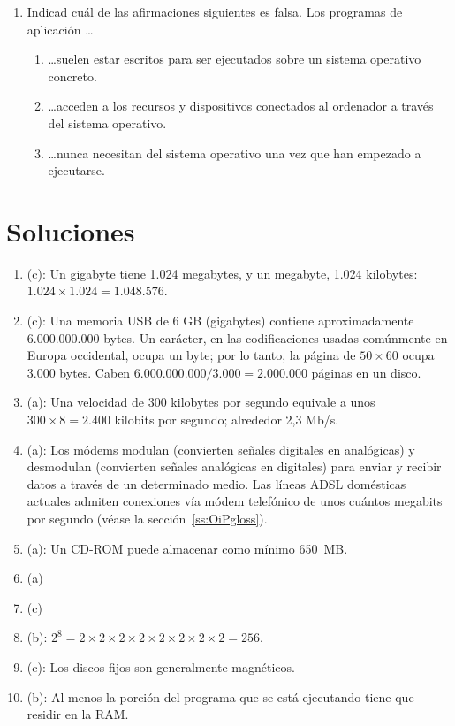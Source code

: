 \begin{enumerate}
\item Indicad cuál de las afirmaciones siguientes es falsa. Los programas de aplicación \ldots \begin{enumerate} \item \ldots suelen estar escritos para ser ejecutados sobre un sistema operativo concreto. \item \ldots acceden a los recursos y dispositivos conectados al ordenador a través del sistema operativo. \item \ldots nunca necesitan del sistema operativo una vez que han empezado a ejecutarse. \end{enumerate} 

\end{enumerate} 

\section{Soluciones} \begin{enumerate} \item (c): Un gigabyte tiene 1.024 megabytes, y un megabyte, 1.024 kilobytes: $1.024 \times 1.024 = 1.048.576$. \item (c): Una memoria USB de 6 GB (gigabytes) contiene aproximadamente 6.000.000.000 bytes. Un carácter, en las codificaciones usadas comúnmente en Europa occidental, ocupa un byte; por lo tanto, la página de $50\times60$ ocupa 3.000 bytes. Caben $6.000.000.000/3.000=2.000.000$ páginas en un disco. \item (a): Una velocidad de 300 kilobytes por segundo equivale a unos $300 \times 8=2.400$ kilobits por segundo; alrededor 2,3 Mb/s. \item (a): Los módems modulan (convierten señales digitales en analógicas) y desmodulan (convierten señales analógicas en digitales) para enviar y recibir datos a través de un determinado medio. Las líneas ADSL domésticas actuales admiten conexiones vía módem telefónico de unos cuántos megabits por segundo (véase la sección~\ref{ss:OiPgloss}). \item (a): Un CD-ROM puede almacenar como mínimo 650~MB. 

\item (a) \item (c) \item (b): $2^8=2\times 2\times 2\times 2\times 2\times 2\times 2\times 2=256$. \item (c): Los discos fijos son generalmente magnéticos. \item (b): Al menos la porción del programa que se está ejecutando tiene que residir en la RAM. 


\end{enumerate}
